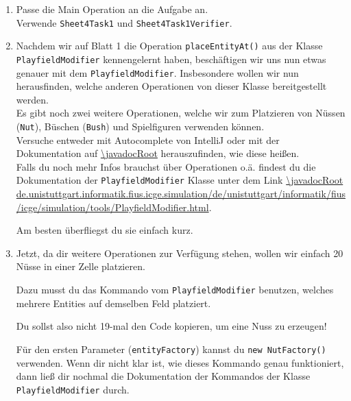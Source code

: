 
\label{ex4}

\begin{enumerate}
    \item 
    Passe die Main Operation an die Aufgabe an.\\
		Verwende \lstinline{Sheet4Task1} und \lstinline{Sheet4Task1Verifier}.
\end{enumerate}



\begin{enumerate} \setcounter{enumi}{1}
    

    \item Nachdem wir auf Blatt 1 die Operation \lstinline{placeEntityAt()} aus der Klasse \lstinline{PlayfieldModifier} kennengelernt haben, beschäftigen wir uns nun etwas genauer mit dem \lstinline{PlayfieldModifier}.
        Insbesondere wollen wir nun herausfinden, welche anderen Operationen von dieser Klasse bereitgestellt werden. \\
        Es gibt noch zwei weitere Operationen, welche wir zum Platzieren von Nüssen (\lstinline{Nut}), Büschen (\lstinline{Bush}) und Spielfiguren verwenden können.\\

        Versuche entweder mit Autocomplete von IntelliJ oder mit der Dokumentation auf \url{\javadocRoot} herauszufinden, wie diese heißen.\\

        Falls du noch mehr Infos brauchst über Operationen o.ä. findest du die Dokumentation der \newline \lstinline{PlayfieldModifier} Klasse unter dem Link \url{\javadocRoot de.unistuttgart.informatik.fius.icge.simulation/de/unistuttgart/informatik/fius/icge/simulation/tools/PlayfieldModifier.html}.

        Am besten überfliegst du sie einfach kurz.

\end{enumerate}



\begin{enumerate} \setcounter{enumi}{2}
    \item Jetzt, da dir weitere Operationen zur Verfügung stehen, wollen wir einfach 20 Nüsse in einer Zelle platzieren.

    Dazu musst du das Kommando vom \lstinline{PlayfieldModifier} benutzen, welches mehrere Entities auf demselben Feld platziert.
    
    Du sollst also nicht 19-mal den Code kopieren, um eine Nuss zu erzeugen!
    
    Für den ersten Parameter (\lstinline{entityFactory}) kannst du \lstinline{new NutFactory()} verwenden.
    Wenn dir nicht klar ist, wie dieses Kommando genau funktioniert, dann ließ dir nochmal die Dokumentation der Kommandos der Klasse \lstinline{PlayfieldModifier} durch.
\end{enumerate}




